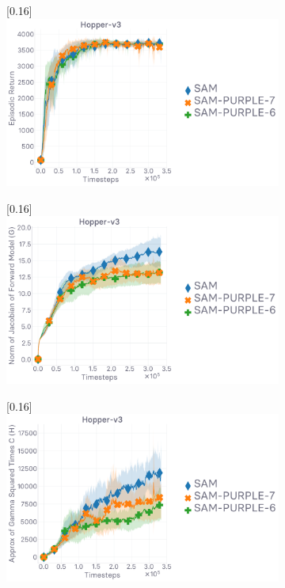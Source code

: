\begin{figure}[H]
  \center
  \begin{subfigure}[t]{0.33\textwidth}
    \center\scalebox{0.16}[0.16]{\includegraphics{Plots/purple_f_psi_hopper/plots_eval_env_ret_plot.pdf}}
  \end{subfigure}
  \begin{subfigure}[t]{0.33\textwidth}
    \center\scalebox{0.16}[0.16]{\includegraphics{Plots/purple_f_psi_hopper/plots_mod_2_plot.pdf}}
  \end{subfigure}
  \begin{subfigure}[t]{0.33\textwidth}
    \center\scalebox{0.16}[0.16]{\includegraphics{Plots/purple_f_psi_hopper/plots_gamma2c_plot.pdf}}

\end{subfigure}
\end{figure}
